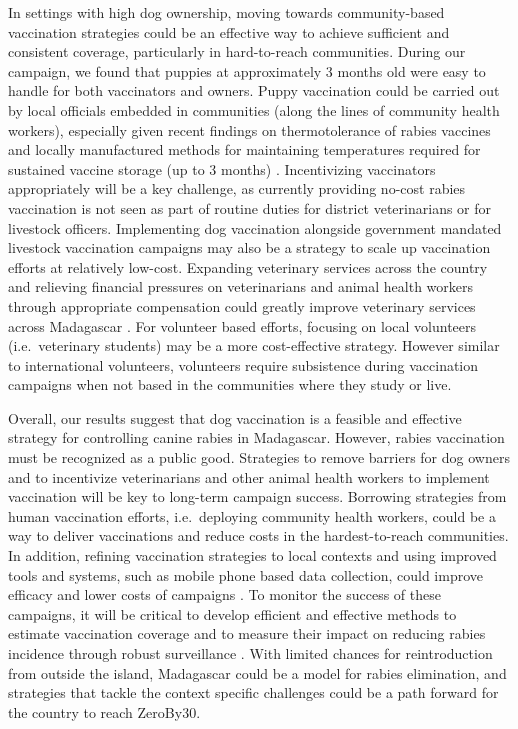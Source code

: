 \documentclass[tropicalmed,article,submit,moreauthors,pdftex]{mdpi}
\begin{document}
In settings with high dog ownership, moving towards community-based
vaccination strategies could be an effective way to achieve sufficient
and consistent coverage, particularly in hard-to-reach communities.
During our campaign, we found that puppies at approximately 3 months old
were easy to handle for both vaccinators and owners. Puppy vaccination
could be carried out by local officials embedded in communities (along
the lines of community health workers), especially given recent findings
on thermotolerance of rabies vaccines and locally manufactured methods
for maintaining temperatures required for sustained vaccine storage (up
to 3 months) \citep{lugelo2020}. Incentivizing vaccinators appropriately
will be a key challenge, as currently providing no-cost rabies
vaccination is not seen as part of routine duties for district
veterinarians or for livestock officers. Implementing dog vaccination
alongside government mandated livestock vaccination campaigns may also
be a strategy to scale up vaccination efforts at relatively low-cost.
Expanding veterinary services across the country and relieving financial
pressures on veterinarians and animal health workers through appropriate
compensation could greatly improve veterinary services across Madagascar
\citep{mondiale2017evaluation}. For volunteer based efforts, focusing on
local volunteers (i.e.~veterinary students) may be a more cost-effective
strategy. However similar to international volunteers, volunteers
require subsistence during vaccination campaigns when not based in the
communities where they study or live.

Overall, our results suggest that dog vaccination is a feasible and
effective strategy for controlling canine rabies in Madagascar. However,
rabies vaccination must be recognized as a public good. Strategies to
remove barriers for dog owners and to incentivize veterinarians and
other animal health workers to implement vaccination will be key to
long-term campaign success. Borrowing strategies from human vaccination
efforts, i.e.~deploying community health workers, could be a way to
deliver vaccinations and reduce costs in the hardest-to-reach
communities. In addition, refining vaccination strategies to local
contexts and using improved tools and systems, such as mobile phone
based data collection, could improve efficacy and lower costs of
campaigns \citep{mazeri2021, gibson2016a}. To monitor the success of
these campaigns, it will be critical to develop efficient and effective
methods to estimate vaccination coverage and to measure their impact on
reducing rabies incidence through robust surveillance
\citep{lushasi2020, ferguson2020}. With limited chances for
reintroduction from outside the island, Madagascar could be a model for
rabies elimination, and strategies that tackle the context specific
challenges could be a path forward for the country to reach ZeroBy30.
\end{document}
